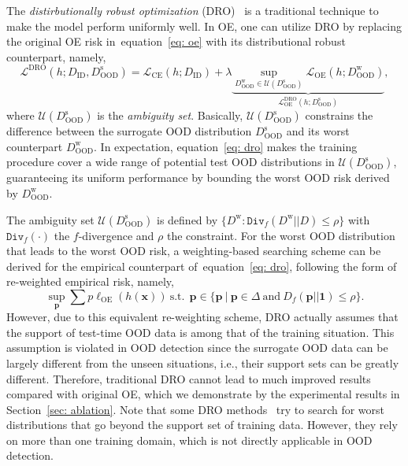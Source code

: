 \documentclass{article} \usepackage{iclr2022_conference,times}
\def\eqref#1{equation~\ref{#1}}
\begin{document}
The \emph{distirbutionally robust optimization} (DRO)~\citep{rahimian2019distributionally} is a traditional technique to make the model perform uniformly well. In OE, one can utilize DRO by replacing the original OE risk in~\eqref{eq: oe} with its distributional robust counterpart, namely,
\begin{equation}
     {\mathcal{L}}^\text{DRO}(h;D_\text{ID}, D_\text{OOD}^\text{s})={\mathcal{L}}_\text{CE}(h; D_\text{ID}) + \lambda \underbrace{\sup_{D^\text{w}_\text{OOD}\in\mathcal{U}(D^\text{s}_\text{OOD})} {\mathcal{L}}_\text{OE}(h; D^\text{w}_\text{OOD})}_{\mathcal{L}^\text{DRO}_\text{OE} (h; D_\text{OOD}^\text{s})}, \label{eq: dro}
\end{equation}
where $\mathcal{U}(D^\text{s}_\text{OOD})$ is the \emph{ambiguity set}. Basically, $\mathcal{U}(D^\text{s}_\text{OOD})$ constrains the difference between the surrogate OOD distribution $D^\text{s}_\text{OOD}$ and its worst counterpart $D^\text{w}_\text{OOD}$. In expectation, \eqref{eq: dro} makes the training procedure cover a wide range of potential test OOD distributions in $\mathcal{U}(D^\text{s}_\text{OOD})$, guaranteeing its uniform performance by bounding the worst OOD risk derived by $D_\text{OOD}^\text{w}$.


The ambiguity set $\mathcal{U}(D^\text{s}_\text{OOD})$ is defined by $\{D^\text{w}:\texttt{Div}_f(D^\text{w}||D)\le\rho\}$ with $\texttt{Div}_f(\cdot)$ the $f$-divergence and $\rho$ the constraint. For the worst OOD distribution that leads to the worst OOD risk, a weighting-based searching scheme can be derived for the empirical counterpart of~\eqref{eq: dro}, following the form of re-weighted empirical risk, namely,
\begin{equation}
\sup_{\boldsymbol{p}} \sum p  \ell_\text{OE} (h(\boldsymbol{x}))~\text{s.t.}~~\boldsymbol{p}\in\{\boldsymbol{p}~|~\boldsymbol{p}\in\Delta~\text{and}~D_f(\boldsymbol{p}||\boldsymbol{1})\le \rho \}. \label{eq: s2r}
\end{equation}
However, due to this equivalent re-weighting scheme, DRO actually assumes that the support of test-time OOD data is among that of the training situation. This assumption is violated in OOD detection since the surrogate OOD data can be largely different from the unseen situations, i.e., their support sets can be greatly different. Therefore, traditional DRO cannot lead to much improved results compared with original OE, which we demonstrate by the experimental results in Section~\ref{sec: ablation}. {Note that some DRO methods~\citep{krueger2021out} try to search for worst distributions that go beyond the support set of training data. However, they rely on more than one training domain, which is not directly applicable in OOD detection. }
\end{document}

